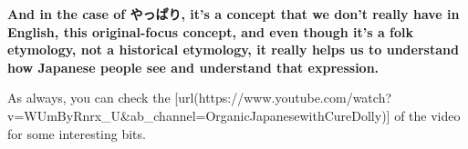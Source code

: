 {\bf And in the case of やっぱり, it's a concept that we don't really have in English, this original-focus concept, and even though it's a folk etymology, not a historical etymology, it really helps us to understand how Japanese people see and understand that expression.}

As always, you can check the [url(https://www.youtube.com/watch?v=WUmByRnrx_U&ab_channel=OrganicJapanesewithCureDolly)] of the video for some interesting bits.

{}

{}

\stopsectionlevel

\stopsectionlevel
